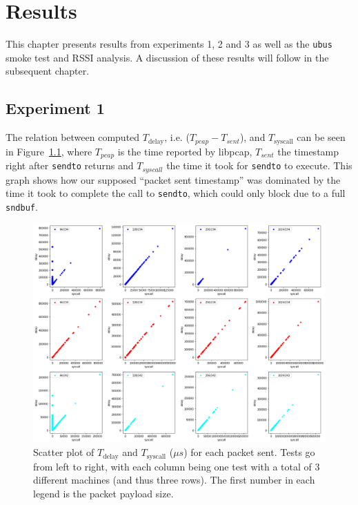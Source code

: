 
\chapter{Results}

This chapter presents results from experiments 1, 2 and 3 as well as the
\texttt{ubus} smoke test and RSSI analysis. A discussion of these results will
follow in the subsequent chapter.

\section{Experiment 1}

The relation between computed $T_\text{delay}$, i.e. ($T_{pcap} - T_{sent}$), and
$T_\text{syscall}$ can be seen in Figure~\ref{fig:sysdelay}, where $T_{pcap}$
is the time reported by libpcap, $T_{sent}$ the timestamp right after
\texttt{sendto} returns and $T_{syscall}$ the time it took for \texttt{sendto}
to execute. This graph shows how our supposed ``packet sent timestamp'' was
dominated by the time it took to complete the call to \texttt{sendto}, which
could only block due to a full \texttt{sndbuf}.

\begin{figure}[tbp]
  \centering
  \includegraphics[width=1.2\textwidth]{images/delay-vs-syscall.png}
  \caption{Scatter plot of $T_\text{delay}$ and $T_\text{syscall}$ ($\mu s$) for each packet sent.
  Tests go from left to right, with each column being one test with a total of 3 different machines (and thus three rows).
  The first number in each legend is the packet payload size.}
  \label{fig:sysdelay}
\end{figure}


